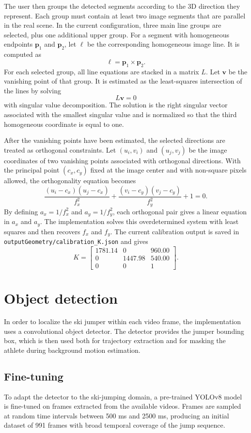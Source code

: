 The user then groups the detected segments according to the 3D direction they represent. Each group must contain at least two image segments that are parallel in the real scene. In the current configuration, three main line groups are selected, plus one additional upper group. For a segment with homogeneous endpoints \(\mathbf{p}_1\) and \(\mathbf{p}_2\), let \(\ell\) be the corresponding homogeneous image line. It is computed as
\[
\ell = \mathbf{p}_1 \times \mathbf{p}_2.
\]
For each selected group, all line equations are stacked in a matrix \(L\). Let \(\mathbf{v}\) be the vanishing point of that group. It is estimated as the least-squares intersection of the lines by solving
\[
L\mathbf{v} = 0
\]
with singular value decomposition. The solution is the right singular vector associated with the smallest singular value and is normalized so that the third homogeneous coordinate is equal to one.

After the vanishing points have been estimated, the selected directions are treated as orthogonal constraints. Let \((u_i,v_i)\) and \((u_j,v_j)\) be the image coordinates of two vanishing points associated with orthogonal directions. With the principal point \((c_x,c_y)\) fixed at the image center and with non-square pixels allowed, the orthogonality equation becomes
\[
\frac{(u_i-c_x)(u_j-c_x)}{f_x^2}
+
\frac{(v_i-c_y)(v_j-c_y)}{f_y^2}
+ 1 = 0.
\]
By defining \(a_x = 1/f_x^2\) and \(a_y = 1/f_y^2\), each orthogonal pair gives a linear equation in \(a_x\) and \(a_y\). The implementation solves this overdetermined system with least squares and then recovers \(f_x\) and \(f_y\). The current calibration output is saved in \texttt{outputGeometry/calibration\_K.json} and gives
\[
K =
\begin{bmatrix}
1781.14 & 0 & 960.00 \\
0 & 1447.98 & 540.00 \\
0 & 0 & 1
\end{bmatrix}.
\]

\section{Object detection}
In order to localize the ski jumper within each video frame, the implementation uses a convolutional object detector. The detector provides the jumper bounding box, which is then used both for trajectory extraction and for masking the athlete during background motion estimation.

\subsection{Fine-tuning}
To adapt the detector to the ski-jumping domain, a pre-trained YOLOv8 model is fine-tuned on frames extracted from the available videos. Frames are sampled at random time intervals between 500 ms and 2500 ms, producing an initial dataset of 991 frames with broad temporal coverage of the jump sequence.

